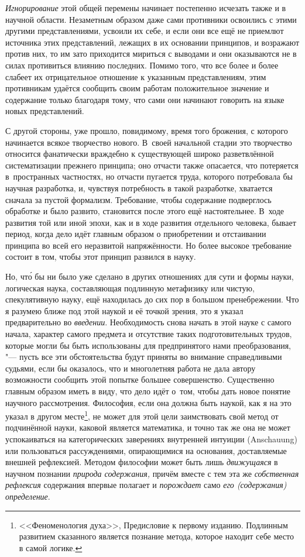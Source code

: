 {\em Игнорирование} этой общей перемены начинает постепенно исчезать также и в
научной области. Незаметным образом даже сами противники освоились с этими
другими представлениями, усвоили их себе, и если они все ещё не приемлют
источника этих представлений, лежащих в их основании принципов, и возражают
против них, то им зато приходится мириться с выводами и они оказываются не в
силах противиться влиянию последних. Помимо того, что все более и более слабеет
их отрицательное отношение к указанным представлениям, этим противникам удаётся
сообщить своим работам положительное значение и содержание только благодаря
тому, что сами они начинают говорить на языке новых представлений.

С другой стороны, уже прошло, повидимому, время того брожения, с которого
начинается всякое творчество нового. В~своей начальной стадии это творчество
относится фанатически враждебно к существующей широко разветвлённой
систематизации прежнего принципа; оно отчасти также опасается, что потеряется
в~пространных частностях, но отчасти пугается труда, которого потребовала бы
научная разработка, и, чувствуя потребность в такой разработке, хватается
сначала за пустой формализм. Требование, чтобы содержание подверглось обработке
и было развито, становится после этого ещё настоятельнее. В~ходе развития той
или иной эпохи, как и в ходе развития отдельного человека, бывает период, когда
дело идёт главным образом о приобретении и отстаивании принципа во всей его
неразвитой напряжённости. Но более высокое требование состоит в том, чтобы этот
принцип развился в науку.

Но, чт\'{о} бы ни было уже сделано в других отношениях для сути и формы науки,
логическая наука, составляющая подлинную метафизику или чистую, спекулятивную
науку, ещё находилась до сих пор в большом пренебрежении. Что я разумею ближе
под этой наукой и её точкой зрения, это я указал предварительно во
{\em введении}. Необходимость снова начать в этой науке с самого начала,
характер самого предмета и отсутствие таких подготовительных трудов, которые
могли бы быть использованы для предпринятого нами преобразования, "--- пусть
все эти обстоятельства будут приняты во внимание справедливыми судьями, если бы
оказалось, что и многолетняя работа не дала автору возможности сообщить этой
попытке большее совершенство. Существенно главным образом иметь в виду, что
дело идёт о~том, чтобы дать новое понятие научного рассмотрения. Философия,
если она должна быть наукой, как я на это указал в другом
месте\footnote{<<Феноменология духа>>, Предисловие к первому изданию. Подлинным
развитием сказанного является познание метода, которое находит себе место в
самой логике.}, не может для этой цели
заимствовать свой метод от подчинённой науки, каковой является математика, и
точно так же она не может успокаиваться на категорических заверениях внутренней
интуиции (Anschauung) или пользоваться рассуждениями, опирающимися на
основания, доставляемые внешней рефлексией. Методом философии может быть лишь
{\em движущаяся} в научном познании {\em природа содержания,} причём вместе с
тем эта же {\em собственная рефлексия} содержания впервые полагает и
{\em порождает} само {\em его (содержания) определение}.

